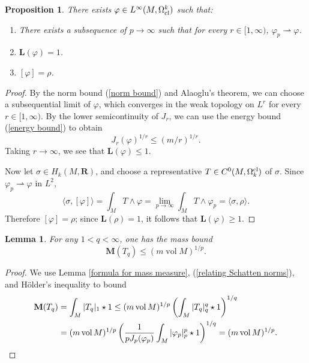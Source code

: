\documentclass[reqno,11pt]{amsart}
\newcommand{\RR}{\mathbf{R}}
\DeclareMathOperator{\vol}{vol}
\newcommand{\Mass}{\mathbf M}
\newcommand{\Comass}{\mathbf L}
\newcommand{\weakto}{\rightharpoonup}
\newtheorem{lemma}[theorem]{Lemma}
\newtheorem{proposition}[theorem]{Proposition}
\theoremstyle{definition}
\numberwithin{equation}{section}
\begin{document}
\begin{proposition}
There exists $\varphi \in L^\infty(M, \Omega^k_{\rm cl})$ such that:
\begin{enumerate}
\item There exists a subsequence of $p \to \infty$ such that for every $r \in [1, \infty)$, $\varphi_p \weakto \varphi$.
\item $\Comass(\varphi) = 1$.
\item $[\varphi] = \rho$.
\end{enumerate}
\end{proposition}
\begin{proof}
By the norm bound (\ref{norm bound}) and Alaoglu's theorem, we can choose a subsequential limit of $\varphi$, which converges in the weak topology on $L^r$ for every $r \in [1, \infty)$.
By the lower semicontinuity of $J_r$, we can use the energy bound (\ref{energy bound}) to obtain 
$$J_r(\varphi)^{1/r} \leq (m/r)^{1/r}.$$
Taking $r \to \infty$, we see that $\Comass(\varphi) \leq 1$.

Now let $\sigma \in H_k(M, \RR)$, and choose a representative $T \in C^0(M, \Omega^{\rm cl}_k)$ of $\sigma$.
Since $\varphi_p \weakto \varphi$ in $L^2$,
$$\langle \sigma, [\varphi]\rangle = \int_M T \wedge \varphi = \lim_{p \to \infty} \int_M T \wedge \varphi_p = \langle \sigma, \rho\rangle.$$
Therefore $[\varphi] = \rho$; since $\Comass(\rho) = 1$, it follows that $\Comass(\varphi) \geq 1$.
\end{proof}

\begin{lemma}
For any $1 < q < \infty$, one has the mass bound 
\begin{equation}\label{mass bound}
\Mass(T_q) \leq (m \vol M)^{1/p}.
\end{equation}
\end{lemma}
\begin{proof}
We use Lemma \ref{formula for mass measure}, (\ref{relating Schatten norms}), and H\"older's inequality to bound 
\begin{align*}
\Mass(T_q) 
&= \int_M |T_q|_1 \star 1 
\leq (m \vol M)^{1/p} \left(\int_M |T_q|_q^q \star 1\right)^{1/q} \\
&= (m \vol M)^{1/p} \left(\frac{1}{p J_p(\varphi_p)} \int_M |\varphi_p|_p^p \star 1\right)^{1/q} 
= (m \vol M)^{1/p}. \qedhere
\end{align*}
\end{proof}
\end{document}
